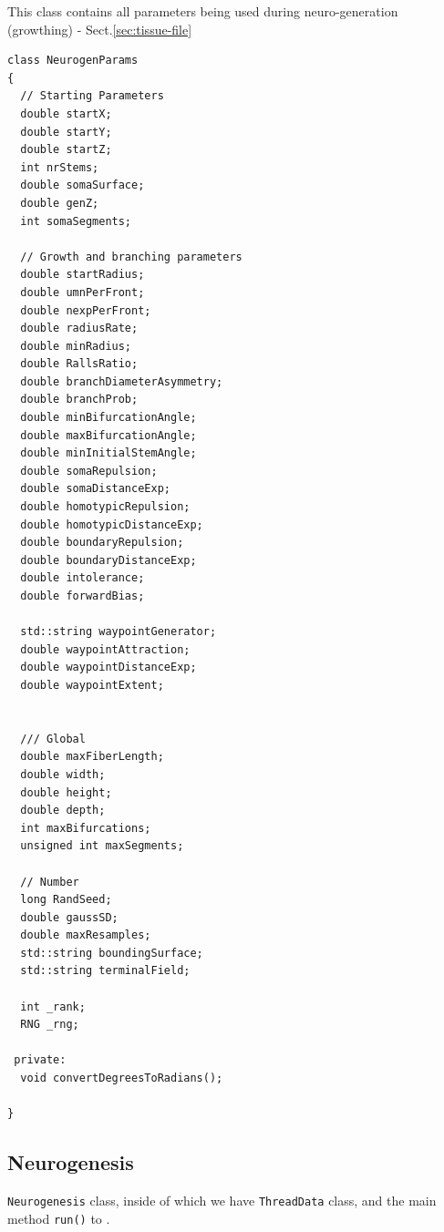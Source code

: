 This class contains all parameters being used during neuro-generation
(growthing) - Sect.\ref{sec:tissue-file}

\begin{verbatim}
class NeurogenParams
{
  // Starting Parameters
  double startX;
  double startY;
  double startZ;
  int nrStems;
  double somaSurface;
  double genZ;
  int somaSegments;

  // Growth and branching parameters
  double startRadius;
  double umnPerFront;
  double nexpPerFront;
  double radiusRate;
  double minRadius;
  double RallsRatio;
  double branchDiameterAsymmetry;
  double branchProb;
  double minBifurcationAngle;
  double maxBifurcationAngle;
  double minInitialStemAngle;
  double somaRepulsion;
  double somaDistanceExp;
  double homotypicRepulsion;
  double homotypicDistanceExp;
  double boundaryRepulsion;
  double boundaryDistanceExp;
  double intolerance;
  double forwardBias;
  
  std::string waypointGenerator;
  double waypointAttraction;
  double waypointDistanceExp;
  double waypointExtent;


  /// Global
  double maxFiberLength;
  double width;
  double height;
  double depth;
  int maxBifurcations;
  unsigned int maxSegments;

  // Number
  long RandSeed;
  double gaussSD;
  double maxResamples;
  std::string boundingSurface;
  std::string terminalField;

  int _rank;
  RNG _rng;

 private:
  void convertDegreesToRadians();

}
\end{verbatim}

\subsection{Neurogenesis}
\label{sec:Neurogenesis}

\verb!Neurogenesis! class, inside of which we have \verb!ThreadData! class, and
the main method \verb!run()! to .

